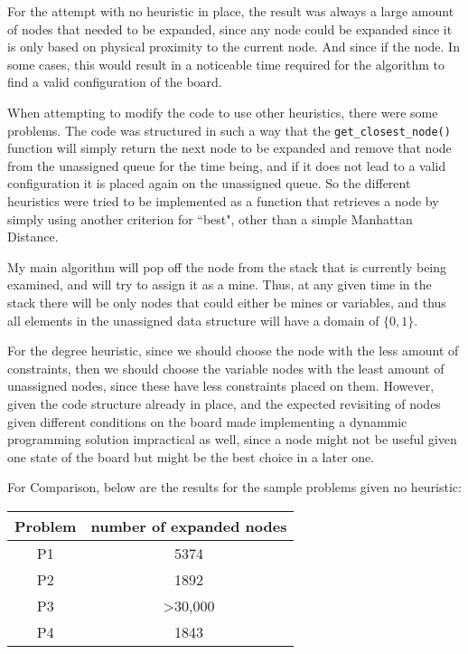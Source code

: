 \documentclass{article}
\begin{document}
For the attempt with no heuristic in place, the result was always a large amount of nodes that needed to be expanded, since any node 
could be expanded since it is only based on physical proximity to the current node. And since if the node. In some cases, this would
result in a noticeable time required for the algorithm to find a valid configuration of the board.

When attempting to modify the code to use other heuristics, there were some problems. The code was structured in such a way that 
the \texttt{get\_closest\_node()} function will simply return the next node to be expanded and remove that node from the unassigned 
queue for the time being, and if it does not lead to a valid configuration it is placed again on the unassigned queue. 
So the different heuristics were tried to be implemented as a function that retrieves a node by simply using another 
criterion for ``best", other than a simple Manhattan Distance. 

My main algorithm will pop off the node 
from the stack that is currently  being examined, and will try to assign it as a mine. Thus, at any given time in the stack there 
will be only nodes that could either be mines or variables, and thus all elements in the unassigned data structure will have a 
domain of $\{0,1\}$. 

For the degree heuristic, since we should choose the node with the less amount of constraints, then we should choose the variable 
nodes with the least amount of unassigned nodes, since these have less constraints placed on them. However, given the code structure 
already in place, and the expected revisiting of nodes given different conditions on the board made implementing a dynammic programming
solution impractical as well, since a node might not be useful given one state of the board but might be the best choice in a later one. 

For Comparison, below are the results for the sample problems given no heuristic:

\begin{center}
		\begin{tabular}{| c | c | }
				\hline
				Problem & number of expanded nodes \\ \hline
				P1 & 5374 \\ \hline
				P2 & 1892 \\ \hline
				P3 & >30,000\\ \hline
				P4  &  1843 \\
				\hline
		\end{tabular}
\end{center}
\end{document}
